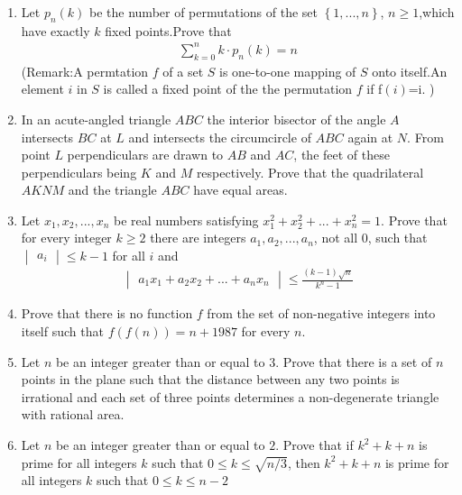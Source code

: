 \documentclass[12pt,-letter paper]{article}
\providecommand{\mydet}[1]{\ensuremath{\begin{vmatrix}#1\end{vmatrix}}}
\providecommand{\cbrak}[1]{\ensuremath{\left\{#1\right\}}}
\providecommand{\brak}[1]{\ensuremath{\left(#1\right)}}
\begin{document}
   \begin{enumerate}
  
	   \item Let $p_n \brak{k}$ be the number of permutations of the set $\cbrak{1,...,n}$, $n\geq1$,which have exactly $k$ fixed points.Prove that \\
	   \begin{align*}   \sum_{k=0}^{n} k \cdot p_n\brak{k} = n 
	   \end{align*} 
		   (Remark:A permtation $f$ of a set $S$ is one-to-one mapping of $S$ onto itself.An element $i$ in $S$ is called a fixed point of the the permutation $f$ if f\brak{i}=i. )
   
	   \item In an acute-angled triangle $ABC$ the interior bisector of the angle $A$ intersects $BC$ at $L$ and intersects the circumcircle of $ABC$ again at $N$. From point $L$ perpendiculars are drawn to $AB$ and $AC$, the feet of these perpendiculars being $K$ and $M$ respectively. Prove that the quadrilateral $AKNM$ and the triangle $ABC$ have equal areas.
	 
	   \item Let $x_1, x_2, . . . , x_n$ be real numbers satisfying $x^2_1 +x^2_2 +. . . +x^2_n = 1$. Prove that for every integer $k\geq2$ there are integers $a_1, a_2, . . . , a_n$, not all $0$, such that $\mydet{a_i}\leq k-1$ for all $i$ and \\
		   \begin{align*} \mydet{a_1x_1+a_2x_2+...+a_nx_n} \leq \frac{\brak{k-1}\sqrt{n}}{k^n-1} \end{align*}
		   
           \item Prove that there is no function $f$ from the set of non-negative integers into itself such that $f\brak{f\brak{n}}=n+1987$ for every $n$.

	  \item Let $n$ be an integer greater than or equal to $3$. Prove that there is a set of $n$ points in the plane such that the distance between any two points is irrational and each set of three points determines a non-degenerate triangle with rational area.


	  \item Let $n$ be an integer greater than or equal to $2$. Prove that if $k^2+k+n$ is prime for all integers $k$ such that $0\leq k\leq \sqrt{n/3}$, then $k^2+k+n$ is prime for all integers $k$ such that $0\leq k\leq n-2$ 
		



   \end{enumerate}
   
\end{document}
